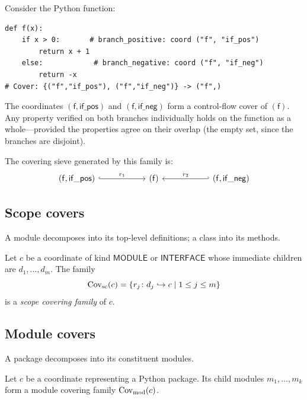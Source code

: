 \documentclass[11pt]{article}
\begin{document}
\begin{example}\label{ex:cf-cover}
Consider the Python function:
\begin{lstlisting}[style=jugeo-python,caption={Control-flow cover: if/else
  branches cover the function body.},label=lst:cf-cover]
def f(x):
    if x > 0:       # branch_positive: coord ("f", "if_pos")
        return x + 1
    else:            # branch_negative: coord ("f", "if_neg")
        return -x
# Cover: {("f","if_pos"), ("f","if_neg")} -> ("f",)
\end{lstlisting}
The coordinates $(\mathsf{f}, \mathsf{if\_pos})$ and
$(\mathsf{f}, \mathsf{if\_neg})$ form a control-flow cover of $(\mathsf{f})$.
Any property verified on both branches individually holds on the function as
a whole---provided the properties agree on their overlap (the empty set, since
the branches are disjoint).
\end{example}

The covering sieve generated by this family is:
\[
\begin{tikzcd}[column sep=2cm]
  (\mathsf{f},\mathsf{if\_pos})
    \arrow[r, hook, "r_1"]
  & (\mathsf{f})
  & (\mathsf{f},\mathsf{if\_neg})
    \arrow[l, hook', "r_2"']
\end{tikzcd}
\]

\subsection{Scope covers}

A module decomposes into its top-level definitions; a class into its methods.

\begin{definition}\label{def:scope-cover}
Let $c$ be a coordinate of kind $\mathsf{MODULE}$ or $\mathsf{INTERFACE}$
whose immediate children are $d_1, \ldots, d_m$.  The family
\[
  \mathrm{Cov}_{\mathrm{sc}}(c) = \{r_j \colon d_j \hookrightarrow c \mid 1 \leq j \leq m\}
\]
is a \emph{scope covering family} of $c$.
\end{definition}

\subsection{Module covers}

A package decomposes into its constituent modules.

\begin{definition}\label{def:mod-cover}
Let $c$ be a coordinate representing a Python package.  Its child modules
$m_1, \ldots, m_k$ form a module covering family $\mathrm{Cov}_{\mathrm{mod}}(c)$.
\end{definition}
\end{document}
